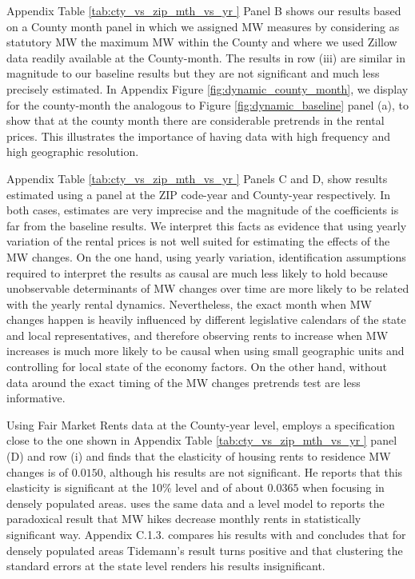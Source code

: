 Appendix Table \ref{tab:cty_vs_zip_mth_vs_yr } Panel B shows our results based on a County 
month panel in which we assigned MW measures by considering as statutory MW the maximum MW within
the County and where we used Zillow data readily available at the County-month. The results in 
row (iii) are similar in magnitude to our baseline results but they are not significant and 
much less precisely estimated. In Appendix Figure \ref{fig:dynamic_county_month}, we display 
for the county-month the analogous to Figure \ref{fig:dynamic_baseline} panel (a), to show that 
at the county month there are considerable pretrends in the rental prices. This illustrates 
the importance of having data with high frequency and high geographic resolution. 

Appendix Table \ref{tab:cty_vs_zip_mth_vs_yr } Panels C and D, show results estimated
using a panel at the ZIP code-year and County-year respectively. In both cases, estimates
are very imprecise and the magnitude of the coefficients is far from the baseline results. 
We interpret this facts as evidence that using yearly variation of the rental prices is not 
well suited for estimating the effects of the MW changes. On the one hand, using yearly variation, 
identification assumptions required to interpret the results as causal are much less likely 
to hold because unobservable determinants of MW changes over time are more likely to be 
related with the yearly rental dynamics. Nevertheless, the exact month when MW changes 
happen is heavily influenced by different legislative calendars of the state and local 
representatives, and therefore observing rents to increase when MW increases is much 
more likely to be causal when using small geographic units and controlling for local 
state of the economy factors. On the other hand, without data around the exact timing of the 
MW changes pretrends test are less informative.

Using Fair Market Rents data at the County-year level, \textcite{Yamagishi2019} employs a 
specification close to the one shown in Appendix Table \ref{tab:cty_vs_zip_mth_vs_yr } 
panel (D) and row (i) and finds that the elasticity of housing rents to residence MW changes 
is of $0.0150$, although his results are not significant. He reports that this elasticity is 
significant at the 10\% level and of about $0.0365$ when focusing in densely populated areas.
\textcite{Tidemann2018} uses the same data and a level model to reports the paradoxical 
result that MW hikes decrease monthly rents in statistically significant way. \textcite{Yamagishi2019} 
Appendix C.1.3. compares his results with \textcite{Tidemann2018} and concludes that for densely 
populated areas Tidemann's result turns positive and that clustering the standard errors at the
state level renders his results insignificant.

